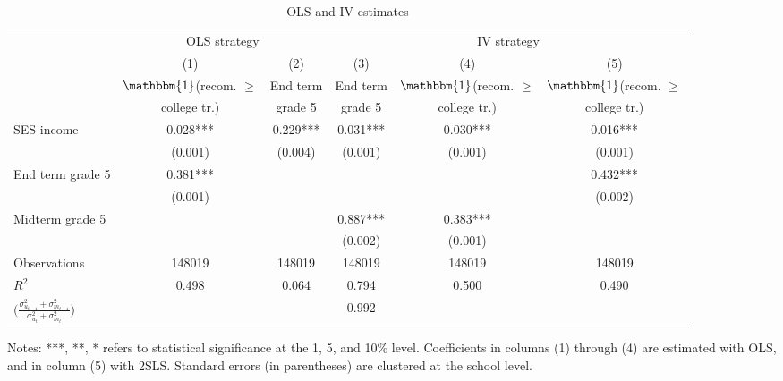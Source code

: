 \begin{table}[t!]
\begin{center}
\caption{OLS and IV estimates}
\label{tbl:OLS_IV}
\begin{tabular}{l*{5}{c}}
\toprule\toprule
&\multicolumn{2}{c}{OLS strategy}&\multicolumn{3}{c}{IV strategy}\\
&\multicolumn{1}{c}{(1)}&\multicolumn{1}{c}{(2)}&\multicolumn{1}{c}{(3)}&\multicolumn{1}{c}{(4)}&\multicolumn{1}{c}{(5)}\\
&\multicolumn{1}{c}{$\mathbbm{1}$(recom. $\geq$}&\multicolumn{1}{c}{End term}&\multicolumn{1}{c}{End term}&\multicolumn{1}{c}{$\mathbbm{1}$(recom. $\geq$}&\multicolumn{1}{c}{$\mathbbm{1}$(recom. $\geq$}\\
[-0.75em]
&\multicolumn{1}{c}{college tr.)}&\multicolumn{1}{c}{grade 5}&\multicolumn{1}{c}{grade 5}&\multicolumn{1}{c}{college tr.)}&\multicolumn{1}{c}{college tr.)}\\
\midrule 
SES income          &       0.028***&       0.229***  & 0.031***
                    &       0.030***&       0.016***\\
                    &     (0.001)   &     (0.004)   &     (0.001) &     (0.001)   &     (0.001)   \\
End term grade 5    &       0.381***&              &                                  &               &       0.432***\\
                    &     (0.001)   &                &            &               &     (0.002)   \\
Midterm grade 5     &       &        &       0.887***&       0.383***&               \\
                    &        &     &     (0.002)   &     (0.001)  &               \\              
[.25em]
Observations        &      148019   &      148019   & 148019  & 148019  & 148019  \\
\(R^{2}\)           &       0.498   &       0.064   &  0.794 & 0.500 &   0.490   \\
$\Bigg(\frac{\sigma_{u_{t-1}}^2+\sigma_{m_{t-1}}^2}{ \sigma_{u_{t}}^2+\sigma_{m_{t}}^2}\Bigg)$ &   &   &  0.992 &   &   \\
\bottomrule \bottomrule
    \end{tabular}
        \begin{tablenotes}
	\footnotesize
        \item[] Notes:  ***, **, * refers to statistical significance at the 1, 5, and 10\% level. Coefficients in columns (1) through (4) are estimated with OLS, and in column (5) with 2SLS. Standard errors (in parentheses) are clustered at the school level.
        \end{tablenotes}
 \end{center}
\end{table}

